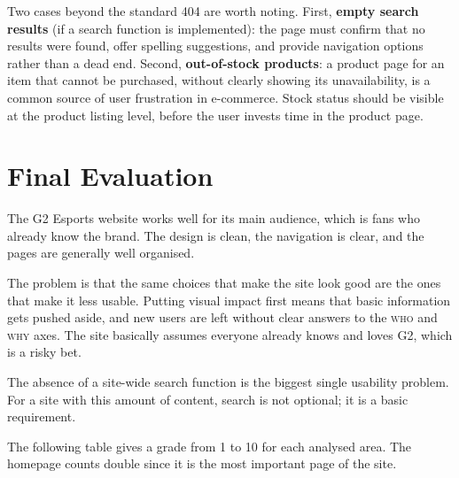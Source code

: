 \documentclass[12pt, a4paper]{article}
\begin{document}
Two cases beyond the standard 404 are worth noting. First, \textbf{empty search results} (if a search function is implemented): the page must confirm that no results were found, offer spelling suggestions, and provide navigation options rather than a dead end. Second, \textbf{out-of-stock products}: a product page for an item that cannot be purchased, without clearly showing its unavailability, is a common source of user frustration in e-commerce. Stock status should be visible at the product listing level, before the user invests time in the product page.

\newpage
\section{Final Evaluation}

The G2 Esports website works well for its main audience, which is fans who already know the brand. The design is clean, the navigation is clear, and the pages are generally well organised.

The problem is that the same choices that make the site look good are the ones that make it less usable. Putting visual impact first means that basic information gets pushed aside, and new users are left without clear answers to the \textsc{who} and \textsc{why} axes. The site basically assumes everyone already knows and loves G2, which is a risky bet.

The absence of a site-wide search function is the biggest single usability problem. For a site with this amount of content, search is not optional; it is a basic requirement.

The following table gives a grade from 1 to 10 for each analysed area. The homepage counts double since it is the most important page of the site.
\end{document}
